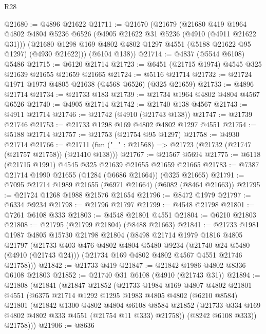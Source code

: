 \begin{lexlean}{R28}
\begin{coremodule}
@21680 := @4896 @21622
@21711 := @21670
    (@21679
      (@21680
        @419
        @1964
        @4802
        @4804
        @5236
        @6526
        (@4905 @21622 @31 @5236 (@4910 (@4911 @21622 @31)))
        (@21680 @1298 @169 @4802 @4802 @1297 @4551 (@5188 @21622 @95 @1297) (@4930 @21622)))
      (@6104 @138))
@21714 := @4837 (@5544 @6108) @5486
@21715 := @6120 @21714
@21723 := @6451 (@21715 @1974) @4545 @325 @21639 @21655 @21659 @21665
@21724 := @5116 @21714
@21732 := @21724 @1971 @1973 @4805 @21638 (@4568 @6526) (@325 @21659)
@21733 := @4896 @21714
@21734 := @21733 @183
@21739 := @21734 @1964 @4802 @4804 @4567 @6526
@21740 := @4905 @21714
@21742 := @21740 @138 @4567
@21743 := @4911 @21714
@21746 := @21742 (@4910 (@21743 @138))
@21747 := @21739 @21746
@21753 := @21733 @1298 @169 @4802 @4802 @1297 @4551
@21754 := @5188 @21714
@21757 := @21753 (@21754 @95 @1297)
@21758 := @4930 @21714
@21766 := @21711 (fun ("_" : @21568) => @21723 (@21732 (@21747 (@21757 @21758)) (@21410 @138)))
@21767 := @21567 @5694
@21775 := @6118 (@21715 @1991) @4545 @325 @21639 @21655 @21659 @21665
@21783 := @7387 @21714 @1990 @21655 (@1284 (@6686 @21664)) (@325 @21665)
@21791 := @7095 @21714 @1989 @21655 (@6971 @21664) (@6082 (@8464 @21663))
@21795 := @21724 @1268 @1988 @21576 @21654
@21796 := @8472 @1979
@21797 := @6334 @9234
@21798 := @21796 @21797
@21799 := @4548 @21798
@21801 := @7261 @6108 @333
@21803 := @4548 @21801 @4551
@21804 := @6210 @21803
@21808 := @21795 (@21799 @21804) (@8488 @21663)
@21841 := @21733
    @1981
    @1987
    @4805
    @15730
    @21798
    @21804
    (@8498
      @21714
      @1979
      @1816
      @4805
      @21797
      (@21733
        @403
        @476
        @4802
        @4804
        @5480
        @9234
        (@21740 @24 @5480 (@4910 (@21743 @24)))
        (@21734 @169 @4802 @4802 @4567 @4551 @21746 @21758)))
@21842 := @21733 @419
@21847 := @21842 @1986 @4802 @8336 @6108 @21803
@21852 := @21740 @31 @6108 (@4910 (@21743 @31))
@21894 := @21808
    (@21841
      (@21847
        @21852
        (@21733
          @1984
          @169
          @4807
          @4802
          @21801
          @4551
          (@6375
            @21714
            @1292
            @1295
            @1983
            @4805
            @4802
            (@6210 @8584)
            @21801
            (@21842
              @1300
              @4802
              @4804
              @6108
              @8584
              @21852
              (@21733 @334 @169 @4802 @4802 @333 @4551 (@21754 @11 @333) @21758))
            (@8242 @6108 @333))
          @21758)))
@21906 := @8636

\end{coremodule}
\end{lexlean}
